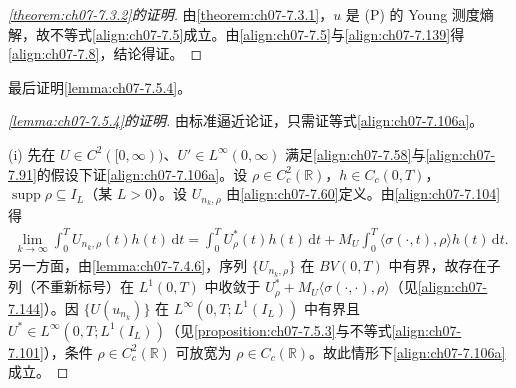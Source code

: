 \documentclass[../../main.tex]{subfiles}%
\begin{document}
\begin{proof}[\cref{theorem:ch07-7.3.2}的证明]
由\cref{theorem:ch07-7.3.1}，$u$ 是 (P) 的 Young 测度熵解，故不等式\eqref{align:ch07-7.5}成立。由\eqref{align:ch07-7.5}与\eqref{align:ch07-7.139}得\eqref{align:ch07-7.8}，结论得证。
\end{proof}

最后证明\cref{lemma:ch07-7.5.4}。

\begin{proof}[\cref{lemma:ch07-7.5.4}的证明]
由标准逼近论证，只需证等式\eqref{align:ch07-7.106a}。

(i) 先在 $U\in C^2([0,\infty))$、$U'\in L^\infty(0,\infty)$ 满足\eqref{align:ch07-7.58}与\eqref{align:ch07-7.91}的假设下证\eqref{align:ch07-7.106a}。设 $\rho\in C^2_c(\mathbb{R})$，$h\in C_c(0,T)$，$\operatorname{supp}\rho\subseteq I_L$（某 $L>0$）。设 $U_{n_k,\rho}$ 由\eqref{align:ch07-7.60}定义。由\eqref{align:ch07-7.104}得
\begin{align}
\lim_{k\to\infty}\int_0^T U_{n_k,\rho}(t)h(t)\,\mathrm{d}t
=\int_0^T U_\rho^*(t)h(t)\,\mathrm{d}t+M_U\int_0^T\langle\sigma(\cdot,t),\rho\rangle h(t)\,\mathrm{d}t. \label{align:ch07-7.144}
\end{align}
另一方面，由\cref{lemma:ch07-7.4.6}，序列 $\{U_{n_k,\rho}\}$ 在 $BV(0,T)$ 中有界，故存在子列（不重新标号）在 $L^1(0,T)$ 中收敛于 $U_\rho^*+M_U\langle\sigma(\cdot,\cdot),\rho\rangle$（见\eqref{align:ch07-7.144}）。因 $\{U(u_{n_k})\}$ 在 $L^\infty(0,T;L^1(I_L))$ 中有界且 $U^*\in L^\infty(0,T;L^1(I_L))$（见\cref{proposition:ch07-7.5.3}与不等式\eqref{align:ch07-7.101}），条件 $\rho\in C^2_c(\mathbb{R})$ 可放宽为 $\rho\in C_c(\mathbb{R})$。故此情形下\eqref{align:ch07-7.106a}成立。


\end{proof}
\end{document}
